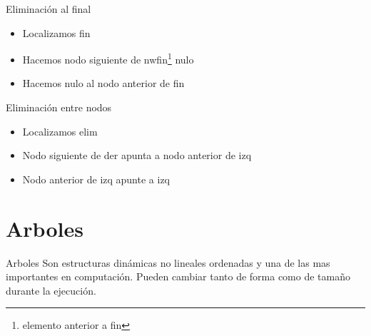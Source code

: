 \documentclass{beamer}
\begin{document}
\begin{frame}{Eliminaci\'on al final}
	\begin{itemize}
		\item Localizamos fin
		\item Hacemos nodo siguiente de nwfin\footnote{elemento anterior a fin} nulo
		\item Hacemos nulo al nodo anterior de fin
	\end{itemize}
\end{frame}

\begin{frame}{Eliminaci\'on entre nodos}
	\begin{itemize}
		\item Localizamos elim
		\item Nodo siguiente de der apunta a nodo anterior de izq
		\item Nodo anterior de izq apunte a izq\nocite{BHASIN,BJARNE1,BJARNE2,CAIRO,CPP,DEITEL,DOWNEY,JAWORSKI,KENN,lAAKMANN,MATTHES,RAMALHO,SED,BRASSARD,CAIRO2}
	\end{itemize}
\end{frame}

\section{Arboles}

\begin{frame}{Arboles}
	Son estructuras din\'amicas no lineales ordenadas y una de las mas importantes en computaci\'on.
	Pueden cambiar tanto de forma como de tamaño durante la ejecuci\'on.\\
	\centering
{}
\end{frame}
\end{document}
